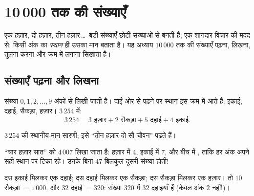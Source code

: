 \chapter{10\,000 तक की संख्याएँ}\label{ch:g3:numbers}

एक हज़ार, दो हज़ार, तीन हज़ार\,\dots\ बड़ी संख्याएँ छोटी
संख्याओं से बनती हैं, एक शानदार विचार की मदद से: किसी अंक का
\emph{स्थान} ही उसका मान बताता है। यह अध्याय $10\,000$ तक की
संख्याएँ पढ़ना, लिखना, तुलना करना और क्रम में लगाना सिखाता है।

\section{संख्याएँ पढ़ना और लिखना}

\begin{definition}[स्थानीय मान]\label{def:g3:numbers:place}
संख्या $0, 1, 2, \dots, 9$ अंकों से लिखी जाती है। दाईं ओर से
पढ़ने पर स्थान इस क्रम में आते हैं: इकाई, दहाई, सैकड़ा, हज़ार।
$3\,254$ में:
\[
3\,254 = 3 \text{ हज़ार} + 2 \text{ सैकड़ा} + 5 \text{ दहाई}
+ 4 \text{ इकाई}.
\]
\end{definition}

\begin{omfigure}

{\small $3\,254$ की स्थानीय-मान सारणी; इसे ``तीन हज़ार दो सौ
चौवन'' पढ़ते हैं।}
\end{omfigure}

\begin{example}[स्थान रोकने वाला शून्य]\label{ex:g3:numbers:zero}
``चार हज़ार सात'' को $4\,007$ लिखा जाता है: हज़ार में $4$,
इकाई में $7$, और बीच में \emph{}, ताकि हर अंक अपने सही
स्थान पर टिका रहे। उनके बिना $47$ बिलकुल दूसरी संख्या होती!
\end{example}

\begin{example}\label{ex:g3:numbers:exchange}
दस इकाई मिलकर एक दहाई; दस दहाई मिलकर एक सैकड़ा; दस सैकड़ा मिलकर
एक हज़ार। तो $10$ सैकड़ा $= 1\,000$, और $32$ दहाई
$= 320$: संख्या $320$ में $32$ दहाइयाँ हैं (केवल अंक
$2$ नहीं!)।
\end{example}

